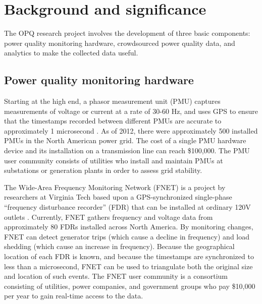 
\section{Background and significance}


The OPQ research project involves the development of three basic components: power quality monitoring hardware, crowdsourced power quality data, and analytics to make the collected data useful. 

\subsection{Power quality monitoring hardware}
\label{sec:background-hardware}

Starting at the high end, a phasor measurement unit (PMU) captures measurements of voltage or current at a rate of 30-60 Hz, and uses GPS to ensure that the timestamps recorded between different PMUs are accurate to approximately 1 microsecond \cite{Zhang2007}. As of 2012, there were approximately 500 installed PMUs in the North American power grid. The cost of a single PMU hardware device and its installation on a transmission line can reach \$100,000. The PMU user community consists of utilities who install and maintain PMUs at substations or generation plants in order to assess grid stability.

The Wide-Area Frequency Monitoring Network (FNET) is a project by researchers at Virginia Tech based upon a GPS-synchronized single-phase ``frequency disturbance recorder'' (FDR) that can be installed at ordinary 120V outlets \cite{Zhang2010}. Currently, FNET gathers frequency and voltage data from approximately 80 FDRs installed across North America.  By monitoring changes, FNET can detect generator trips (which cause a decline in frequency) and load shedding (which cause an increase in frequency). Because the geographical location of each FDR is known, and because the timestamps are synchronized to less than a microsecond, FNET can be used to triangulate both the original size and location of such events. The FNET user community is a consortium consisting of utilities, power companies, and government groups who pay \$10,000 per year to gain real-time access to the data. 

